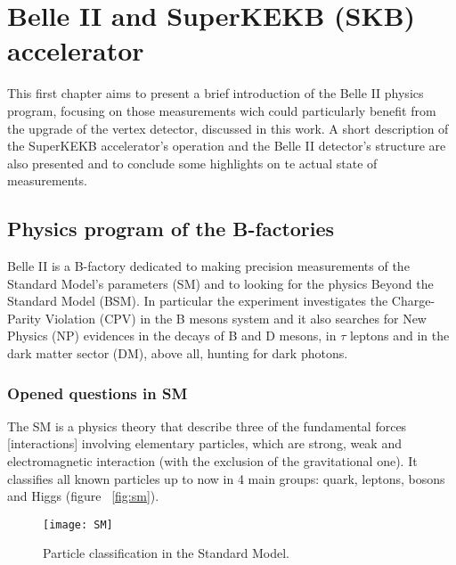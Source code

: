 
\chapter{Belle II and SuperKEKB (SKB) accelerator}

This first chapter aims to present a brief introduction of the Belle II physics program, focusing on those measurements wich could particularly benefit from the upgrade of the vertex detector, discussed in this work. A short description of the SuperKEKB accelerator's operation and the Belle II detector's structure are also presented and to conclude some highlights on te actual state of measurements.



\section{Physics program of the B-factories}

Belle II is a B-factory dedicated to making precision measurements of the Standard Model's parameters (SM) and to looking for the physics Beyond the Standard Model (BSM).
In particular the experiment investigates the Charge-Parity Violation (CPV) in the B mesons system and it also searches for New Physics (NP) evidences in the decays of B and D mesons, in $\tau$ leptons and in the dark matter sector (DM), above all, hunting for dark photons.



\subsection{Opened questions in SM}

The SM is a physics theory that describe three of the fundamental forces [interactions] involving elementary particles, which are strong, weak and electromagnetic interaction (with the exclusion of the gravitational one). It classifies all known particles up to now in 4 main groups: quark, leptons, bosons and Higgs (figure ~\vref{fig:sm}).

\begin{figure}[h]
\centering
\texttt{[image: SM]}
\caption{Particle classification in the Standard Model.}
\label{fig:sm}
\end{figure}

